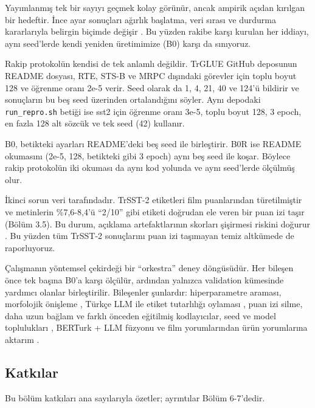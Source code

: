 \documentclass[11pt]{article}
\begin{document}
Yayımlanmış tek bir sayıyı geçmek kolay görünür, ancak ampirik açıdan kırılgan bir hedeftir. İnce ayar sonuçları ağırlık başlatma, veri sırası ve durdurma kararlarıyla belirgin biçimde değişir \citep{dodge2020}. Bu yüzden rakibe karşı kurulan her iddiayı, aynı seed'lerde kendi yeniden üretimimize (B0) karşı da sınıyoruz.

Rakip protokolün kendisi de tek anlamlı değildir. TrGLUE GitHub deposunun README dosyası, RTE, STS-B ve MRPC dışındaki görevler için toplu boyut 128 ve öğrenme oranı 2e-5 verir. Seed olarak da 1, 4, 21, 40 ve 124'ü bildirir ve sonuçların bu beş seed üzerinden ortalandığını söyler. Aynı depodaki \texttt{run\_\allowbreak{}\allowbreak{}repro.\allowbreak{}\allowbreak{}sh} betiği ise sst2 için öğrenme oranı 3e-5, toplu boyut 128, 3 epoch, en fazla 128 alt sözcük ve tek seed (42) kullanır.

B0, betikteki ayarları README'deki beş seed ile birleştirir. B0R ise README okumasını (2e-5, 128, betikteki gibi 3 epoch) aynı beş seed ile koşar. Böylece rakip protokolün iki okuması da aynı kod yolunda ve aynı seed'lerde ölçülmüş olur.

İkinci sorun veri tarafındadır. TrSST-2 etiketleri film puanlarından türetilmiştir \citep{altinok2025} ve metinlerin \%7,6-8,4'ü ``2/\allowbreak{}10'' gibi etiketi doğrudan ele veren bir puan izi taşır (Bölüm 3.5). Bu durum, açıklama artefaktlarının skorları şişirmesi riskini doğurur \citep{gururangan2018}. Bu yüzden tüm TrSST-2 sonuçlarını puan izi taşımayan temiz altkümede de raporluyoruz.

Çalışmanın yöntemsel çekirdeği bir ``orkestra'' deney döngüsüdür. Her bileşen önce tek başına B0'a karşı ölçülür, ardından yalnızca validation kümesinde yardımcı olanlar birleştirilir. Bileşenler şunlardır: hiperparametre araması, morfolojik önişleme \citep{akin2007,zeyrek}, Türkçe LLM \citep{kesgin2024} ile etiket tutarlılığı oylaması \citep{northcutt2021,gilardi2023}, puan izi silme, daha uzun bağlam ve farklı önceden eğitilmiş kodlayıcılar, seed ve model toplulukları \citep{lakshminarayanan2017}, BERTurk + LLM füzyonu ve film yorumlarından ürün yorumlarına aktarım \citep{blitzer2007,gururangan2020}.

\subsection{Katkılar}

Bu bölüm katkıları ana sayılarıyla özetler; ayrıntılar Bölüm 6-7'dedir.
\end{document}
